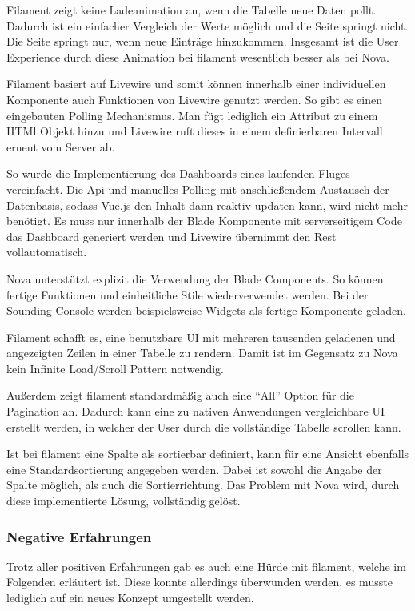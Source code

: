 Filament zeigt keine Ladeanimation an, wenn die Tabelle neue Daten pollt.
Dadurch ist ein einfacher Vergleich der Werte möglich und die Seite springt nicht.
Die Seite springt nur, wenn neue Einträge hinzukommen.
Insgesamt ist die User Experience durch diese Animation bei filament wesentlich besser als bei Nova.

Filament basiert auf Livewire\cite{livewire} und somit können innerhalb einer individuellen Komponente auch Funktionen von Livewire genutzt werden.
So gibt es einen eingebauten Polling Mechanismus.
Man fügt lediglich ein Attribut zu einem HTMl Objekt hinzu und Livewire ruft dieses in einem definierbaren Intervall erneut vom Server ab.

So wurde die Implementierung des Dashboards eines laufenden Fluges vereinfacht.
Die Api und manuelles Polling mit anschließendem Austausch der Datenbasis, sodass Vue.js den Inhalt dann reaktiv updaten kann, wird nicht mehr benötigt.
Es muss nur innerhalb der Blade Komponente mit serverseitigem Code das Dashboard generiert werden und Livewire übernimmt den Rest vollautomatisch.

Nova unterstützt explizit die Verwendung der Blade Components.
So können fertige Funktionen und einheitliche Stile wiederverwendet werden.
Bei der Sounding Console werden beispielsweise Widgets als fertige Komponente geladen.

\newpage

Filament schafft es, eine benutzbare UI mit mehreren tausenden geladenen und angezeigten Zeilen in einer Tabelle zu rendern.
Damit ist im Gegensatz zu Nova kein Infinite Load/Scroll Pattern notwendig.

Außerdem zeigt filament standardmäßig auch eine \enquote{All} Option für die Pagination an.
Dadurch kann eine zu nativen Anwendungen vergleichbare UI erstellt werden, in welcher der User durch die vollständige Tabelle scrollen kann.

Ist bei filament eine Spalte als sortierbar definiert, kann für eine Ansicht ebenfalls eine Standardsortierung angegeben werden.
Dabei ist sowohl die Angabe der Spalte möglich, als auch die Sortierrichtung.
Das Problem mit Nova wird, durch diese implementierte Lösung, vollständig gelöst.

\subsubsection{Negative Erfahrungen}
Trotz aller positiven Erfahrungen gab es auch eine Hürde mit filament, welche im Folgenden erläutert ist.
Diese konnte allerdings überwunden werden, es musste lediglich auf ein neues Konzept umgestellt werden.

